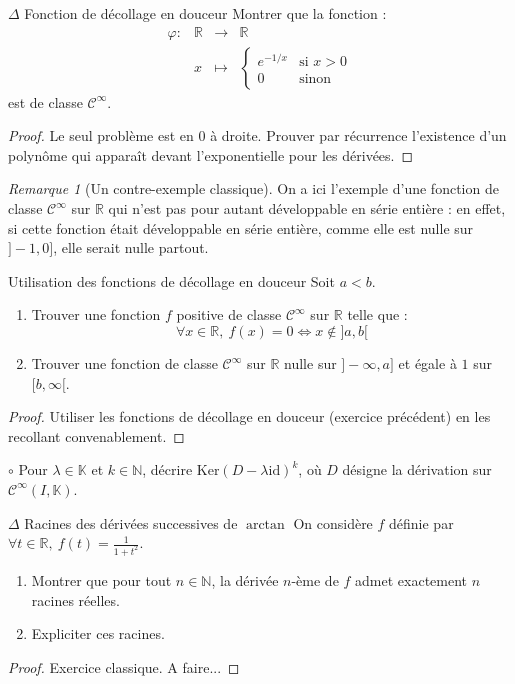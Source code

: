 \documentclass[french,a4paper]{article}
\newcommand{\N}{\mathbb{N}}
\newcommand{\R}{\mathbb{R}}
\newcommand{\K}{\mathbb{K}}
\renewcommand{\ker}{\text{Ker}}
\theoremstyle{plain}
\theoremstyle{definition}
\theoremstyle{remark}
\newtheorem*{rmq}{Remarque}
\begin{document}
\begin{ex}[Moulin.FV.14]{$\Delta$ Fonction de décollage en douceur}
	Montrer que la fonction : $$\begin{array}{lrcl}
		\varphi:&\R&\longrightarrow&\R \\
		&x&\longmapsto&\displaystyle\begin{cases}
			e^{-1/x}&\text{si }x>0 \\
			0&\text{sinon}
		\end{cases}
	\end{array}$$ est de classe $\mathcal{C}^\infty$.
\end{ex}
\begin{proof}
	Le seul problème est en $0$ à droite. Prouver par récurrence l'existence d'un polynôme qui apparaît devant l'exponentielle pour les dérivées.
\end{proof}
\begin{rmq}[Un contre-exemple classique]
	On a ici l'exemple d'une fonction de classe $\mathcal{C}^\infty$ sur $\R$ qui n'est pas pour autant développable en série entière : en effet, si cette fonction était développable en série entière, comme elle est nulle sur $]-1,0]$, elle serait nulle partout.
\end{rmq}

\begin{ex}[Moulin.FV.15]{Utilisation des fonctions de décollage en douceur}
	Soit $a<b$.
	\begin{enumerate}
		\item Trouver une fonction $f$ positive de classe $\mathcal{C}^\infty$ sur $\R$ telle que : $$\forall x\in\R,\ f(x)=0\iff x\notin]a,b[$$
		\item Trouver une fonction de classe $\mathcal{C}^\infty$ sur $\R$ nulle sur $]-\infty,a]$ et égale à $1$ sur $[b,\infty[$.
	\end{enumerate}
\end{ex}
\begin{proof}
	Utiliser les fonctions de décollage en douceur (exercice précédent) en les recollant convenablement.
\end{proof}

\begin{ex}[Moulin.FV.16]{$\circ$}
	Pour $\lambda\in\K$ et $k\in\N$, décrire $\ker(D-\lambda\text{id})^k$, où $D$ désigne la dérivation sur $\mathcal{C}^\infty(I,\K)$.
\end{ex}

\begin{ex}[Moulin.FV.17]{$\Delta$ Racines des dérivées successives de $\arctan$}
	On considère $f$ définie par $\forall t\in\R,\ f(t)=\displaystyle\frac{1}{1+t^2}$. 
	\begin{enumerate}
		\item Montrer que pour tout $n\in\N$, la dérivée $n$-ème de $f$ admet exactement $n$ racines réelles.
		\item Expliciter ces racines.
	\end{enumerate} 
\end{ex}
\begin{proof}
	Exercice classique. A faire...
\end{proof}
\end{document}
